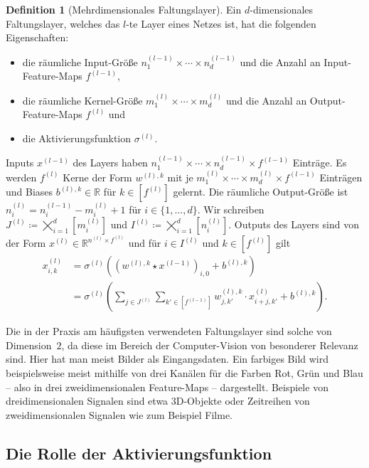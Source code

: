 \documentclass[paper=a4, 	%
		fontsize=11pt, 		%
		abstracton, 	%
		headsepline, 	%
		notitlepage	%
		]{scrartcl}
\theoremstyle{definition}
\newtheorem{definition}[theorem]{Definition}
\newcommand{\R}{\mathbb{R}}
\newcommand{\fNat}[1]{[ #1 ]}
\begin{document}
\begin{definition}[Mehrdimensionales Faltungslayer]\label{def:multi-dimensional-conv-layer}
    Ein $d$-dimensionales Faltungslayer, welches das $l$-te Layer eines Netzes ist, hat die folgenden Eigenschaften:
    \begin{itemize}
        \item die räumliche Input-Größe $n^{(l-1)}_1\times\cdots\times n^{(l-1)}_d$ und die Anzahl an Input-Feature-Maps $f^{(l-1)}$,
        \item die räumliche Kernel-Größe $m^{(l)}_1\times \cdots \times m^{(l)}_d$ und die Anzahl an Output-Feature-Maps $f^{(l)}$ und
        \item die Aktivierungsfunktion $\sigma^{(l)}$.
    \end{itemize}
    Inputs $x^{(l-1)}$ des Layers haben $n^{(l-1)}_1\times\cdots\times n^{(l-1)}_d \times f^{(l-1)}$ Einträge.
    Es werden $f^{(l)}$ Kerne der Form $w^{(l),k}$ mit je $m^{(l)}_1\times\cdots\times m^{(l)}_d \times f^{(l-1)}$ Einträgen und Biases $b^{(l),k}\in\R$ für  $k\in \fNat{f^{(l)}}$ gelernt.
    Die räumliche Output-Größe ist $n^{(l)}_i = n^{(l-1)}_i-  m^{(l)}_i + 1$ für $i\in\{1,\dots, d\}$.
    Wir schreiben $J^{(l)} \coloneqq \bigtimes_{i=1}^d [m^{(l)}_i]$ und $I^{(l)} \coloneqq \bigtimes_{i=1}^d [n^{(l)}_i]$.
    Outputs des Layers sind von der Form $x^{(l)}\in \R^{n^{(l)}\times f^{(l)}}$ und für $i\in I^{(l)}$ und $k\in\fNat{f^{(l)}}$ gilt
    \begin{align*}
        x^{(l)}_{i,k}
        &=  \sigma^{(l)}\left( (w^{(l),k} \star x^{(l-1)})_{i,0} + b^{(l),k} \right)\\
        &= \sigma^{(l)} \left( 
            \sum_{j \in J^{(l)}} \sum_{k'\in \fNat{f^{(l-1)}}}
            w^{(l),k}_{j,k'} \cdot x^{(l)}_{i+j, k'} + b^{(l), k}
        \right).
    \end{align*}
\end{definition}

Die in der Praxis am häufigsten verwendeten Faltungslayer sind solche von Dimension~$2$, da diese im Bereich der Computer-Vision von besonderer Relevanz sind.
Hier hat man meist Bilder als Eingangsdaten.
Ein farbiges Bild wird beispielsweise meist mithilfe von drei Kanälen für die Farben Rot, Grün und Blau -- also in drei zweidimensionalen Feature-Maps -- dargestellt.
Beispiele von dreidimensionalen Signalen sind etwa 3D-Objekte oder Zeitreihen von zweidimensionalen Signalen wie zum Beispiel Filme.

\subsection{Die Rolle der Aktivierungsfunktion}
\end{document}
